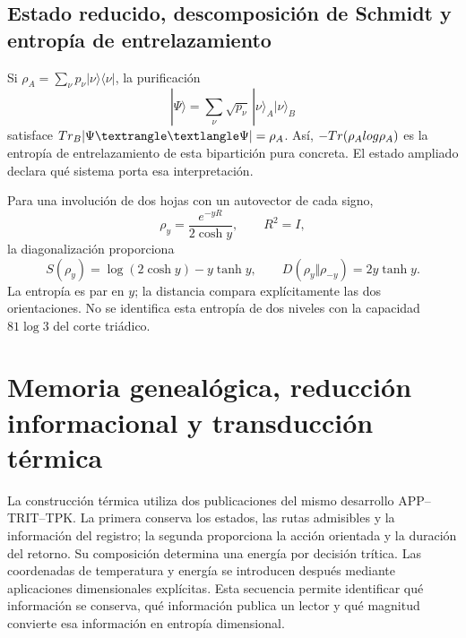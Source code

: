 

\section{Estado reducido, descomposición de Schmidt y entropía de entrelazamiento}
Si $\rho_A=\sum_\nu p_\nu|\nu\rangle\langle\nu|$,
la purificación
\[
|\Psi\rangle=\sum_\nu\sqrt{p_\nu}\,
|\nu\rangle_A|\nu\rangle_B
\]
satisface $\Tr_B|\Psi\rangle\langle\Psi|=\rho_A$.
Así, $-Tr(\rho_Alog\rho_A)$ es la entropía de entrelazamiento
de esta bipartición pura concreta. El estado ampliado declara
qué sistema porta esa interpretación.

Para una involución de dos hojas con un autovector de cada signo,
\[
\rho_y=\frac{e^{-yR}}{2\cosh y},\qquad R^2=I,
\]
la diagonalización proporciona
\[
S(\rho_y)=\log(2\cosh y)-y\tanh y,\qquad
D(\rho_y\Vert\rho_{-y})=2y\tanh y.
\]
La entropía es par en $y$; la distancia compara explícitamente
las dos orientaciones. No se identifica esta entropía de dos niveles
con la capacidad $81\log3$ del corte triádico.




\chapter{Memoria genealógica, reducción informacional y transducción térmica}
\label{x_reciprocidad:v:ant:sec:ii-kb-aut-desarrollo}

La construcción térmica utiliza dos publicaciones del mismo desarrollo
APP--TRIT--TPK. La primera conserva los estados, las rutas admisibles y
la información del registro; la segunda proporciona la acción orientada
y la duración del retorno. Su composición determina una energía por
decisión trítica. Las coordenadas de temperatura y energía se introducen
después mediante aplicaciones dimensionales explícitas. Esta secuencia
permite identificar qué información se conserva, qué información publica
un lector y qué magnitud convierte esa información en entropía dimensional.

